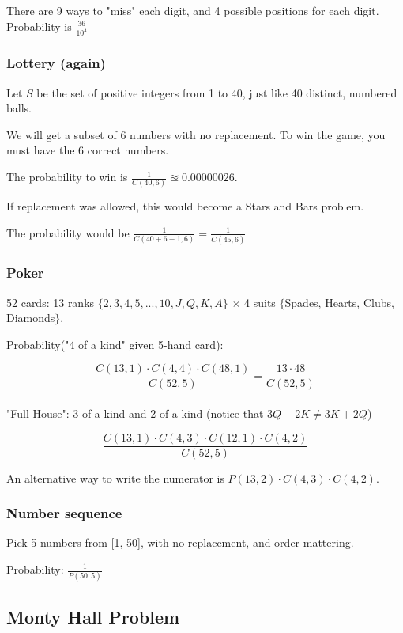 \documentclass[english,openany]{book}
\begin{document}
    There are 9 ways to "miss" each digit, and 4 possible positions for each digit. Probability is $\frac{36}{10^4}$\\

    \subsubsection{Lottery (again)}

    Let $S$ be the set of positive integers from 1 to 40, just like 40 distinct, numbered balls.

    We will get a subset of 6 numbers with no replacement. To win the game, you must have the 6 correct numbers.

    The probability to win is $\frac{1}{C(40,6)} \approxeq 0.00000026$.

    If replacement was allowed, this would become a Stars and Bars problem.

    The probability would be $\frac{1}{C(40+6-1, 6)} = \frac{1}{C(45,6)}$\\

    \subsubsection{Poker}

    52 cards: 13 ranks $\{2,3,4,5,...,10,J,Q,K,A\}$ $\times$ 4 suits $\{$Spades, Hearts, Clubs, Diamonds$\}$.

    Probability("4 of a kind" given 5-hand card):

    $$\frac{C(13,1) \cdot C(4,4) \cdot C(48,1)}{C(52,5)} = \frac{13 \cdot 48}{C(52,5)}$$\\

    "Full House": 3 of a kind and 2 of a kind (notice that $3Q + 2K \neq 3K + 2Q$)

    $$\frac{C(13,1) \cdot C(4,3) \cdot C(12,1) \cdot C(4,2)}{C(52,5)}$$

    An alternative way to write the numerator is $P(13,2) \cdot C(4,3) \cdot C(4,2)$.\\

    \subsubsection{Number sequence}

    Pick 5 numbers from [1, 50], with no replacement, and order mattering.

    Probability: $\frac{1}{P(50,5)}$
    
    \subsection{Monty Hall Problem}
    
\end{document}
